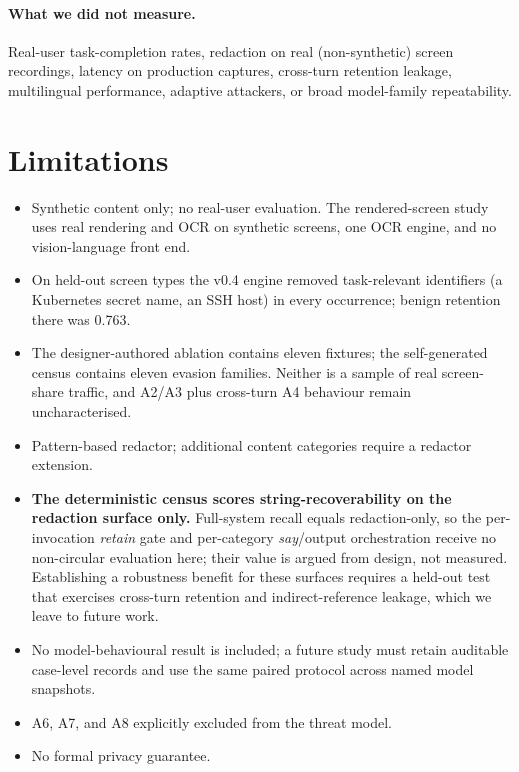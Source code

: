 \documentclass[pdflatex,sn-mathphys-num]{sn-jnl}
\begin{document}
\paragraph{What we did not measure.}
Real-user task-completion rates, redaction on real (non-synthetic) screen
recordings, latency on production captures, cross-turn
retention leakage, multilingual performance, adaptive attackers, or broad
model-family repeatability.

\section{Limitations}\label{sec:limitations}

\begin{itemize}
  \item Synthetic content only; no real-user evaluation. The rendered-screen
        study uses real rendering and OCR on synthetic screens, one OCR engine,
        and no vision-language front end.
  \item On held-out screen types the v0.4 engine removed task-relevant
        identifiers (a Kubernetes secret name, an SSH host) in every
        occurrence; benign retention there was 0.763.
  \item The designer-authored ablation contains eleven fixtures; the self-generated
        census contains eleven evasion families. Neither is a sample of real
        screen-share traffic, and A2/A3 plus cross-turn A4 behaviour remain
        uncharacterised.
  \item Pattern-based redactor; additional content categories require a
        redactor extension.
  \item \textbf{The deterministic census scores string-recoverability on the
        redaction surface only.} Full-system recall equals redaction-only, so the
        per-invocation \textit{retain} gate and per-category \textit{say}/output
        orchestration receive no non-circular evaluation here; their value is
        argued from design, not measured. Establishing a robustness benefit for
        these surfaces requires a held-out test that exercises cross-turn
        retention and indirect-reference leakage, which we leave to future work.
  \item No model-behavioural result is included; a future study must retain
        auditable case-level records and use the same paired protocol across
        named model snapshots.
  \item A6, A7, and A8 explicitly excluded from the threat model.
  \item No formal privacy guarantee.
\end{itemize}
\end{document}
